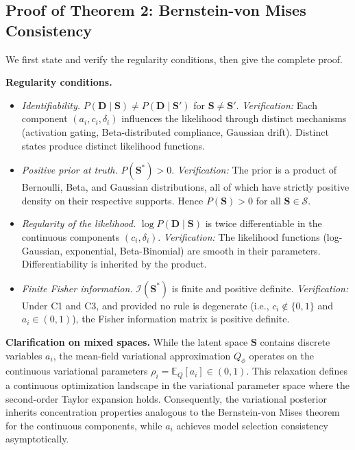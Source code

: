 \subsection{Proof of Theorem 2: Bernstein-von Mises Consistency}

We first state and verify the regularity conditions, then give the
complete proof.

\textbf{Regularity conditions.}

\begin{itemize}[leftmargin=2em]
  \item[\textbf{C1}] \textit{Identifiability.}
        $P(\mathbf{D} \mid \mathbf{S}) \neq P(\mathbf{D} \mid \mathbf{S}')$
        for $\mathbf{S} \neq \mathbf{S}'$.
        \textit{Verification:} Each component $(a_i, c_i, \delta_i)$
        influences the likelihood through distinct mechanisms (activation
        gating, Beta-distributed compliance, Gaussian drift). Distinct
        states produce distinct likelihood functions.

  \item[\textbf{C2}] \textit{Positive prior at truth.}
        $P(\mathbf{S}^*) > 0$.
        \textit{Verification:} The prior is a product of Bernoulli,
        Beta, and Gaussian distributions, all of which have strictly
        positive density on their respective supports. Hence
        $P(\mathbf{S}) > 0$ for all $\mathbf{S} \in \mathcal{S}$.

  \item[\textbf{C3}] \textit{Regularity of the likelihood.}
        $\log P(\mathbf{D} \mid \mathbf{S})$ is twice differentiable
        in the continuous components $(c_i, \delta_i)$.
        \textit{Verification:} The likelihood functions (log-Gaussian,
        exponential, Beta-Binomial) are smooth in their parameters.
        Differentiability is inherited by the product.

  \item[\textbf{C4}] \textit{Finite Fisher information.}
        $\mathcal{I}(\mathbf{S}^*)$ is finite and positive definite.
        \textit{Verification:} Under C1 and C3, and provided no rule
        is degenerate (i.e., $c_i \notin \{0,1\}$ and $a_i \in (0,1)$),
        the Fisher information matrix is positive definite.
\end{itemize}

\medskip
\noindent\textbf{Clarification on mixed spaces.}
While the latent space $\mathbf{S}$ contains discrete variables $a_i$,
the mean-field variational approximation $Q_\phi$ operates on the
continuous variational parameters $\rho_i = \mathbb{E}_{Q}[a_i] \in (0,1)$.
This relaxation defines a continuous optimization landscape in the
variational parameter space where the second-order Taylor expansion holds.
Consequently, the variational posterior inherits concentration properties
analogous to the Bernstein-von Mises theorem for the continuous components,
while $a_i$ achieves model selection consistency asymptotically.


